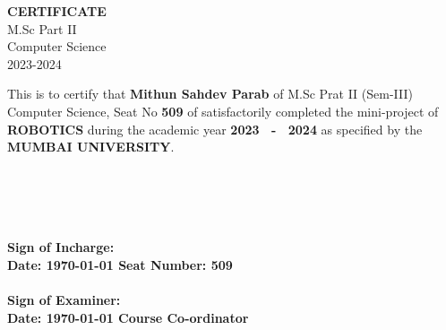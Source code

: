 \begin{center}

    \end{center}
    \begin{center}
    \textbf{ \uppercase{ \Large{CERTIFICATE} \\}}
     \hspace{0.22cm} M.Sc Part II \\
    \hspace{0.22cm} Computer Science \\
    \hspace{0.22cm} 2023-2024 \\
    \end{center}
    \vspace{1cm}
    \begin{center}
            \begin{minipage}{42em}
    \hspace{1.5cm} This is to certify that \textbf{Mithun Sahdev Parab} of M.Sc Prat II (Sem-III) Computer Science, Seat No \textbf{509} of satisfactorily completed the mini-project of \textbf{\uppercase{Robotics}} during the academic year \textbf{2023 \ - \ 2024} as specified by the \textbf{\uppercase{Mumbai University}}.
    \end{minipage}
    \end{center}
\hspace{0.7cm}
\\\\
    \\\\
    \textbf{
    Sign of Incharge: \\
    \hspace{1.5cm}Date: \today        \hspace{5.6cm} \textbf{Seat Number: 509}
    \\\\
    Sign of Examiner: \\
    \hspace{1.5cm}Date:  \today			\hspace{5.5cm}			 Course Co-ordinator}
    
